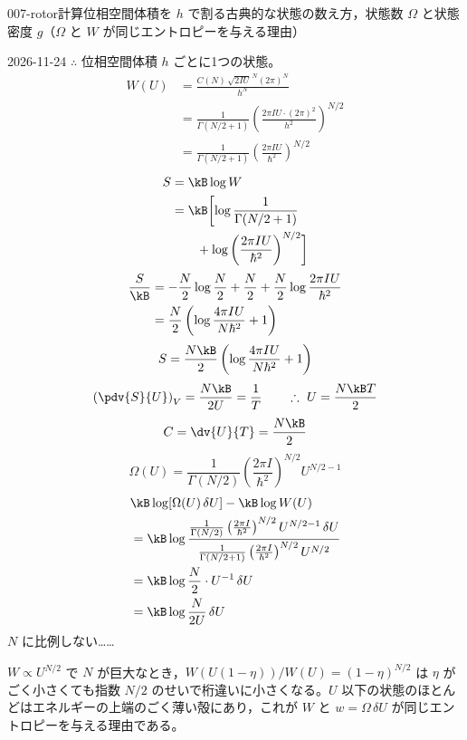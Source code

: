 \documentclass[uplatex,dvipdfmx,a4paper,11pt]{jsarticle}
\begin{document}
\begin{mondai}{007-rotor}{計算}{位相空間体積を $h$ で割る古典的な状態の数え方，状態数 $\Omega$ と状態密度 $g$（$\Omega$ と $W$ が同じエントロピーを与える理由）}
\begin{kotaeutsushi}{2026-11-24}
$\therefore$ 位相空間体積 $h$ ごとに1つの状態。
\begin{align*}
W(U)&=\frac{C(N)\,\sqrt{2IU}^{\,N}(2\pi)^{N}}{h^{N}}\\
&=\frac{1}{\Gamma(N/2+1)}\left(\frac{2\pi IU\cdot(2\pi)^{2}}{h^{2}}\right)^{N/2}\\
&=\frac{1}{\Gamma(N/2+1)}\left(\frac{2\pi IU}{\hbar^{2}}\right)^{N/2}
\end{align*}
\begin{align*}
S&=\kB\log W\\
&=\kB\biggl[\log\frac{1}{\Gamma(N/2+1)}\\
&\qquad+\log\left(\frac{2\pi IU}{\hbar^{2}}\right)^{N/2}\biggr]
\end{align*}
\begin{align*}
\frac{S}{\kB}&=-\frac{N}{2}\log\frac{N}{2}+\frac{N}{2}+\frac{N}{2}\log\frac{2\pi IU}{\hbar^{2}}\\
&=\frac{N}{2}\left(\log\frac{4\pi IU}{N\hbar^{2}}+1\right)
\end{align*}
\[ S=\frac{N\kB}{2}\left(\log\frac{4\pi IU}{N\hbar^{2}}+1\right) \]
\[ \left(\pdv{S}{U}\right)_{V}=\frac{N\kB}{2U}=\frac{1}{T}\qquad\therefore\ U=\frac{N\kB T}{2} \]
\[ C=\dv{U}{T}=\frac{N\kB}{2} \]
\[ \Omega(U)=\frac{1}{\Gamma(N/2)}\left(\frac{2\pi I}{\hbar^{2}}\right)^{N/2}U^{N/2-1} \]
\begin{align*}
&\kB\log[\Omega(U)\,\delta U]-\kB\log W(U)\\
&=\kB\log\frac{\frac{1}{\Gamma(N/2)}\left(\frac{2\pi I}{\hbar^{2}}\right)^{N/2}U^{N/2-1}\,\delta U}{\frac{1}{\Gamma(N/2+1)}\left(\frac{2\pi I}{\hbar^{2}}\right)^{N/2}U^{N/2}}\\
&=\kB\log\frac{N}{2}\cdot U^{-1}\,\delta U\\
&=\kB\log\frac{N}{2U}\,\delta U
\end{align*}
$N$ に比例しない……
\mikai
{}
\end{kotaeutsushi}
\begin{kizuki}
\item $W\propto U^{N/2}$ で $N$ が巨大なとき，$W(U(1-\eta))/W(U)=(1-\eta)^{N/2}$ は $\eta$ がごく小さくても指数 $N/2$ のせいで桁違いに小さくなる。$U$ 以下の状態のほとんどはエネルギーの上端のごく薄い殻にあり，これが $W$ と $w=\Omega\,\delta U$ が同じエントロピーを与える理由である。

\end{kizuki}
\end{mondai}
\end{document}

